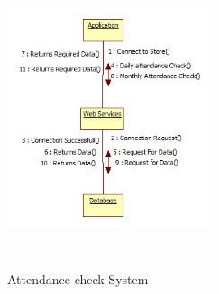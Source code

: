 \begin{figure}[h]
\centering
  \includegraphics[width=6cm,height=8cm]{Fig16.jpg}\\
  \caption{Attendance check  System}
  \label{Attendance check  System}
\end{figure}

